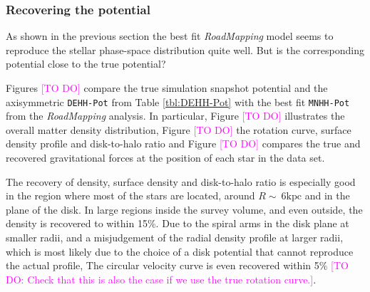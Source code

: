 \documentclass[iop,revtex4,numberedappendix,appendixfloats]{emulateapj}
\newcommand{\RM}{{\sl RoadMapping}}
\newcommand{\Wilma}[1]{\textcolor{Magenta}{#1}}
\begin{document}
\subsubsection{Recovering the potential}

As shown in the previous section the best fit \RM{} model seems to reproduce the stellar phase-space distribution quite well. But is the corresponding potential close to the true potential? 

Figures \Wilma{[TO DO]} compare the true simulation snapshot potential and the axisymmetric \texttt{DEHH-Pot} from Table \ref{tbl:DEHH-Pot} with the best fit \texttt{MNHH-Pot} from the \RM{} analysis. In particular, Figure \Wilma{[TO DO]} illustrates the overall matter density distribution, Figure \Wilma{[TO DO]} the rotation curve, surface density profile and disk-to-halo ratio and Figure \Wilma{[TO DO]} compares the true and recovered gravitational forces at the position of each star in the data set.

The recovery of density, surface density and disk-to-halo ratio is especially good in the region where most of the stars are located, around $R\sim~6\text{kpc}$ and in the plane of the disk. In large regions inside the survey volume, and even outside, the density is recovered to within 15\%. Due to the spiral arms in the disk plane at smaller radii, and a misjudgement of the radial density profile at larger radii, which is most likely due to the choice of a disk potential that cannot reproduce the actual profile, The circular velocity curve is even recovered within 5\% \Wilma{[TO DO: Check that this is also the case if we use the true rotation curve.]}.
\end{document}
